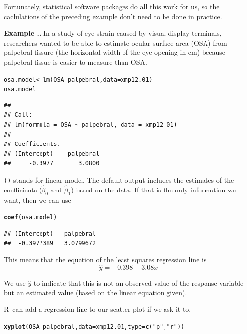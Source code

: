 \documentclass[twoside]{book}\usepackage[]{graphicx}\usepackage[]{xcolor}
\makeatletter
\newcommand{\hlstr}[1]{\textcolor[rgb]{0.192,0.494,0.8}{#1}}%
\newcommand{\hlopt}[1]{\textcolor[rgb]{0,0,0}{#1}}%
\newcommand{\hlstd}[1]{\textcolor[rgb]{0.345,0.345,0.345}{#1}}%
\newcommand{\hlkwb}[1]{\textcolor[rgb]{0.69,0.353,0.396}{#1}}%
\newcommand{\hlkwc}[1]{\textcolor[rgb]{0.333,0.667,0.333}{#1}}%
\newcommand{\hlkwd}[1]{\textcolor[rgb]{0.737,0.353,0.396}{\textbf{#1}}}%
\newenvironment{kframe}{%
 \def\at@end@of@kframe{}%
 \ifinner\ifhmode%
  \def\at@end@of@kframe{\end{minipage}}%
  \begin{minipage}{\columnwidth}%
 \fi\fi%
 \def\FrameCommand##1{\hskip\@totalleftmargin \hskip-\fboxsep
 \colorbox{shadecolor}{##1}\hskip-\fboxsep
     \hskip-\linewidth \hskip-\@totalleftmargin \hskip\columnwidth}%
 \MakeFramed {\advance\hsize-\width
   \@totalleftmargin\z@ \linewidth\hsize
   \@setminipage}}%
 {\par\unskip\endMakeFramed%
 \at@end@of@kframe}
\newenvironment{knitrout}{}{} %
\newcommand{\Rindex}[1]{\index{\texttt{#1}}}
\newcommand{\function}[1]{{\color{purple!75!blue}\texttt{\StrSubstitute{#1}{()}{}()}}\Rindex{#1}}
\def\R{{\sf R}}
\newcounter{example}[section]
\newenvironment{example}%
{\refstepcounter{example}%
\textbf{Example \thesection.\arabic{example}. }}%
{}
\makeatother
\begin{document}
Fortunately, statistical software packages do all this work for us, so the
caclulations of the preceding example don't need to be done in practice.

\begin{example}
In a study of eye strain caused by visual display terminals, researchers wanted
to be able to estimate ocular surface area (OSA) from palpebral fissure (the
horizontal width of the eye opening in cm) because palpebral fissue is easier
to measure than OSA.
\begin{knitrout}
\color{fgcolor}\begin{kframe}
\begin{alltt}
\hlstd{osa.model} \hlkwb{<-} \hlkwd{lm}\hlstd{(OSA} \hlopt{~} \hlstd{palpebral,} \hlkwc{data} \hlstd{= xmp12.01)}
\hlstd{osa.model}
\end{alltt}
\begin{verbatim}
## 
## Call:
## lm(formula = OSA ~ palpebral, data = xmp12.01)
## 
## Coefficients:
## (Intercept)    palpebral  
##     -0.3977       3.0800
\end{verbatim}
\end{kframe}
\end{knitrout}
\function{lm()} stands for linear model.  The default output includes the estimates
of the coefficients ($\hat\beta_0$ and $\hat \beta_1$) based on the data.  If that is the 
only information we want, then we can use 
\begin{knitrout}
\color{fgcolor}\begin{kframe}
\begin{alltt}
\hlkwd{coef}\hlstd{(osa.model)}
\end{alltt}
\begin{verbatim}
## (Intercept)   palpebral 
##  -0.3977389   3.0799672
\end{verbatim}
\end{kframe}
\end{knitrout}

This means that the equation of the least squares regression line is 
\[
\hat y = \ensuremath{-0.398} + 3.08 x
\]

We use $\hat y$ to indicate that this is not an observed value of the response variable
but an estimated value (based on the linear equation given).

\R\ can add a regression line to our scatter plot if we ask it to.
\begin{center}
\begin{knitrout}
\color{fgcolor}\begin{kframe}
\begin{alltt}
\hlkwd{xyplot}\hlstd{(OSA} \hlopt{~} \hlstd{palpebral,} \hlkwc{data} \hlstd{= xmp12.01,} \hlkwc{type} \hlstd{=} \hlkwd{c}\hlstd{(}\hlstr{"p"}\hlstd{,} \hlstr{"r"}\hlstd{))}
\end{alltt}
\end{kframe}


\end{knitrout}
\end{center}
\end{example}
\end{document}
